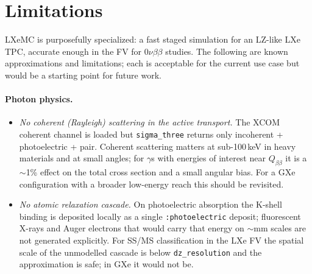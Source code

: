 \documentclass[11pt]{article}
\begin{document}
\section{Limitations}
\label{sec:limitations}

LXeMC is purposefully specialized: a fast staged simulation for an LZ-like
LXe TPC, accurate enough in the FV for $0\nu\beta\beta$ studies. The
following are known approximations and limitations; each is acceptable for
the current use case but would be a starting point for future work.

\paragraph{Photon physics.}
\begin{itemize}
\item \emph{No coherent (Rayleigh) scattering in the active transport.}
The XCOM coherent channel is loaded but \texttt{sigma\_three} returns only
incoherent + photoelectric + pair. Coherent scattering matters at
sub-100\,keV in heavy materials and at small angles; for $\gamma$s with
energies of interest near $Q_{\beta\beta}$ it is a $\sim$1\% effect on the
total cross section and a small angular bias. For a GXe configuration with a
broader low-energy reach this should be revisited.
\item \emph{No atomic relaxation cascade.} On photoelectric absorption the
K-shell binding is deposited locally as a single \texttt{:photoelectric}
deposit; fluorescent X-rays and Auger electrons that would carry that energy
on $\sim$mm scales are not generated explicitly. For SS/MS classification
in the LXe FV the spatial scale of the unmodelled cascade is below
\texttt{dz\_resolution} and the approximation is safe; in GXe it would
not be.
\end{itemize}
\end{document}

